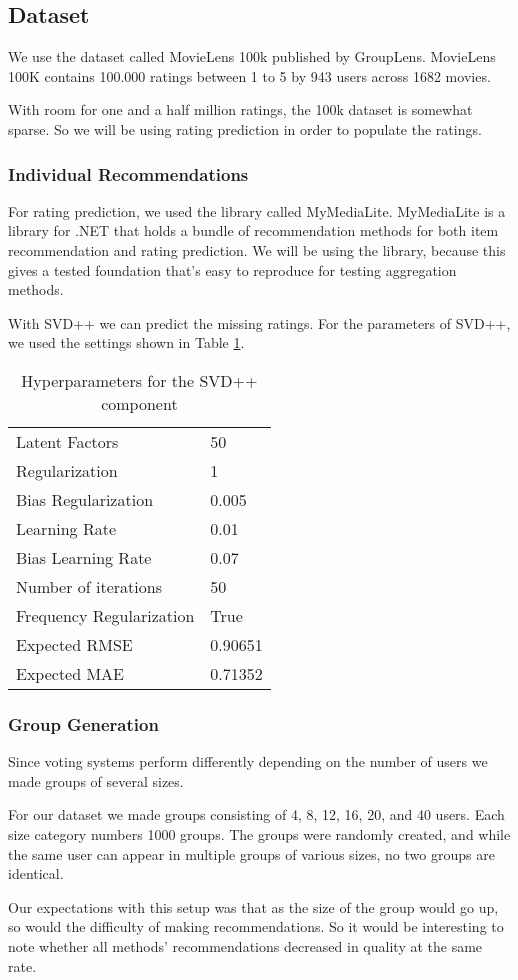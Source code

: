 \subsection{Dataset}\label{sec:dataset}
We use the dataset called MovieLens 100k published by GroupLens\cite{movielens100k}. MovieLens 100K contains 100.000 ratings between 1 to 5 by 943 users across 1682 movies.

With room for one and a half million ratings, the 100k dataset is somewhat sparse. So we will be using rating prediction in order to populate the ratings.

\subsubsection{Individual Recommendations}
For rating prediction, we used the library called MyMediaLite\cite{mymedialite}. MyMediaLite is a library for .NET that holds a bundle of recommendation methods for both item recommendation and rating prediction. We will be using the library, because this gives a tested foundation that's easy to reproduce for testing aggregation methods.

With SVD++ we can predict the missing ratings. For the parameters of SVD++, we used the settings shown in Table \ref{tbl:svdpp}.

\begin{table}[H]
	\centering
	\begin{tabular}{|l|l|}\hline
		Latent Factors & 50 \\
		Regularization & 1	\\
		Bias Regularization & 0.005	\\
		Learning Rate & 0.01 \\
		Bias Learning Rate & 0.07 \\ 
		Number of iterations & 50 \\
		Frequency Regularization & True \\ 
		Expected RMSE & 0.90651 \\
		Expected MAE & 0.71352 \\ \hline
	\end{tabular}
	\caption{Hyperparameters for the SVD++ component}
	\label{tbl:svdpp}
\end{table}

\subsubsection{Group Generation}
Since voting systems perform differently depending on the number of users we made groups of several sizes.

For our dataset we made groups consisting of 4, 8, 12, 16, 20, and 40 users. Each size category numbers 1000 groups. The groups were randomly created, and while the same user can appear in multiple groups of various sizes, no two groups are identical.

Our expectations with this setup was that as the size of the group would go up, so would the difficulty of making recommendations. So it would be interesting to note whether all methods' recommendations decreased in quality at the same rate.